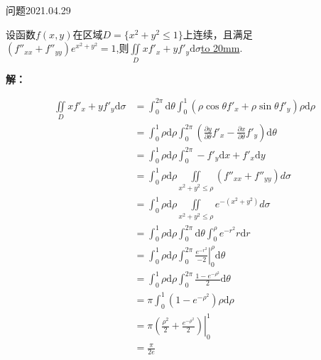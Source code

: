 \begin{mybox}{问题2021.04.29}
	
	\qquad 设函数$f(x,y)$在区域$D=\{x^2+y^2\le 1 \}$上连续，且满足\\
	$(f''_{xx}+f''_{yy})e^{x^2+y^2}=1$,则$\iint \limits_D xf'_{x}+yf'_{y}\mathrm{d}\sigma$\underline{\hbox to 20mm{}}.
\end{mybox}
\noindent
\textbf{解：}

\begin{align*}
\iint\limits_{D} xf'_{x}+yf'_{y}\mathrm{d}\sigma &=\int_{0}^{2\pi} \mathrm{d}\theta \int_{0}^{1}(\rho\cos \theta f'_{x}+\rho\sin \theta f'_{y})\rho \mathrm{d}\rho\\
&=\int_{0}^{1} \rho\mathrm{d}\rho \int_{0}^{2\pi} (\frac{\partial y}{\partial \theta}f'_{x}-\frac{\partial x}{\partial \theta}f'_{y})\mathrm{d}\theta\\
&=\int_{0}^{1}\rho\mathrm{d}\rho\int_{0}^{2\pi}-f'_{y}\mathrm{d}x+f'_{x}\mathrm{d}y\\
&=\int_{0}^{1}\rho\mathrm{d}\rho \iint\limits_{x^2+y^2\le \rho} (f''_{xx}+f''_{yy})d\sigma\\
&=\int_{0}^{1}\rho\mathrm{d}\rho \iint\limits_{x^2+y^2\le \rho} e^{-(x^2+y^2)}d\sigma\\
&=\int_{0}^{1}\rho \mathrm{d}\rho \int_{0}^{2\pi}\mathrm{d} \theta \int_{0}^{\rho} e^{-r^2} r\mathrm{d}r\\
&=\int_{0}^{1}\rho \mathrm{d}\rho \int_{0}^{2\pi} \left. \frac{e^{-r^2}}{-2} \right|_{0}^{\rho} \mathrm{d} \theta\\
&=\int_{0}^{1} \rho \mathrm{d}\rho \int_{0}^{2\pi}\frac{1-e^{-\rho^2}}{2}\mathrm{d}\theta \\
&=\pi\int_{0}^{1} (1-e^{-\rho^2})\rho \mathrm{d}\rho\\
&=\left.\pi(\frac{\rho^2}{2}+\frac{e^{-\rho^2}}{2})\right|_{0}^{1}\\
&=\frac{\pi}{2e}
\end{align*}